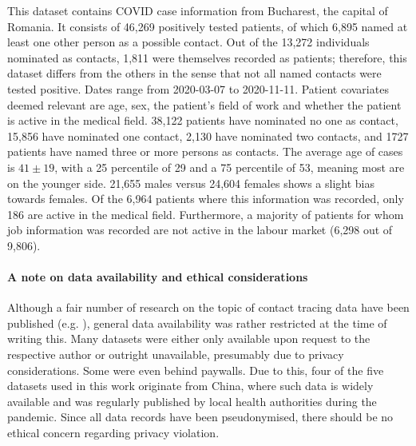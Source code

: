 This dataset contains COVID case information from Bucharest, the capital of Romania. It consists of 46,269 positively tested patients, of which 6,895 named at least one other person as a possible contact. Out of the 13,272 individuals nominated as contacts, 1,811 were themselves recorded as patients; therefore, this dataset differs from the others in the sense that not all named contacts were tested positive. Dates range from 2020-03-07 to 2020-11-11. Patient covariates deemed relevant are age, sex, the patient's field of work and whether the patient is active in the medical field. 38,122 patients have nominated no one as contact, 15,856 have nominated one contact, 2,130 have nominated two contacts, and 1727 patients have named three or more persons as contacts. 
The average age of cases is $41\pm19$, with a 25 percentile of 29 and a 75 percentile of 53, meaning most are on the younger side. 21,655 males versus 24,604 females shows a slight bias towards females. Of the 6,964 patients where this information was recorded, only 186 are active in the medical field. Furthermore, a majority of patients for whom job information was recorded are not active in the labour market (6,298 out of 9,806). 

\paragraph{A note on data availability and ethical considerations} Although a fair number of research on the topic of contact tracing data have been published (e.g. ), general data availability was rather restricted at the time of writing this. Many datasets were either only available upon request to the respective author or outright unavailable, presumably due to privacy considerations. Some were even behind paywalls. Due to this, four of the five datasets used in this work originate from China, where such data is widely available and was regularly published by local health authorities during the pandemic. Since all data records have been pseudonymised, there should be no ethical concern regarding privacy violation.
